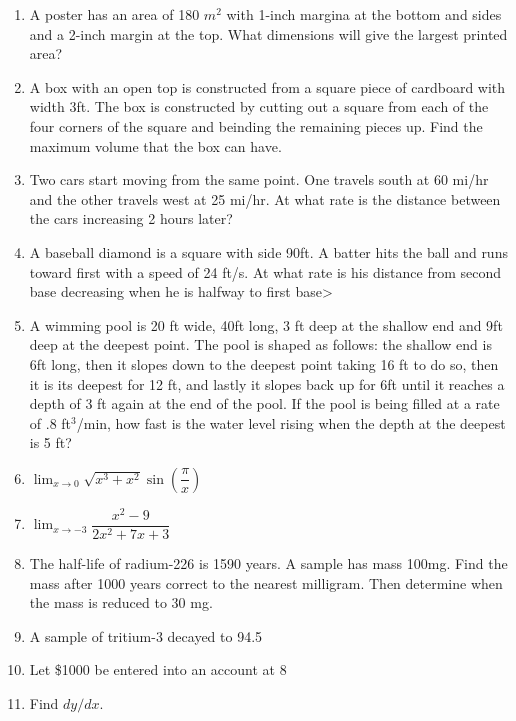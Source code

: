 \documentclass[10pt]{article}
\newcommand{\ds}{\displaystyle}
\theoremstyle{Theorem}
\theoremstyle{definition}
\theoremstyle{remark}
\theoremstyle{custom}
\begin{document}
\begin{enumerate}[1.]
\item A poster has an area of 180 $m^2$ with 1-inch margina at the bottom and sides and a 2-inch margin at the top. What dimensions will give the largest printed area?
\item A box with an open top is constructed from a square piece of cardboard with width 3ft. The box is constructed by cutting out a square from each of the four corners of the square and beinding the remaining pieces up. Find the maximum volume that the box can have.
\item Two cars start moving from the same point. One travels south at 60 mi/hr and the other travels west at 25 mi/hr. At what rate is the distance between the cars increasing 2 hours later?
\item A baseball diamond is a square with side 90ft. A batter hits the ball and runs toward first with a speed of 24 ft/s. At what rate is his distance from second base decreasing when he is halfway to first base>
\item A wimming pool is 20 ft wide, 40ft long, 3 ft deep at the shallow end and 9ft deep at the deepest point. The pool is shaped as follows: the shallow end is 6ft long, then it slopes down to the deepest point taking 16 ft to do so, then it is its deepest for 12 ft, and lastly it slopes back up for 6ft until it reaches a depth of 3 ft again at the end of the pool. If the pool is being filled at a rate of .8 ft$^3$/min, how fast is the water level rising when the depth at the deepest is 5 ft?
\item $\ds\lim_{x\rightarrow0}\sqrt{x^3+x^2}\sin\left(\dfrac{\pi}{x}\right)$
\item $\ds\lim_{x\rightarrow -3}\dfrac{x^2-9}{2x^2+7x+3}$
\item The half-life of radium-226 is 1590 years. A sample has mass 100mg. Find the mass after 1000 years correct to the nearest milligram. Then determine when the mass is reduced to 30 mg.
\newpage
\item A sample of tritium-3 decayed to 94.5%
\item Let \$1000 be entered into an account at 8%
\item Find $dy/dx$.
\begin{enumerate}[a.]

\end{enumerate}
\end{enumerate}
\end{document}
